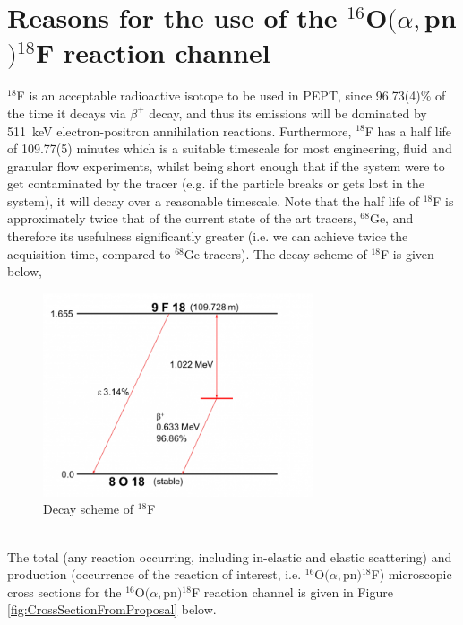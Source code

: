 \documentclass[]{article}
\begin{document}
\section{Reasons for the use of the ${}^{16}$O$(\alpha,$pn$){}^{18}$F reaction channel}\label{reasons for use}
${}^{18}$F is an acceptable radioactive isotope to be used in PEPT, since 96.73(4)$\%$ of the time it decays via $\beta ^+$ decay\cite{nudat}, and thus its emissions will be dominated by \SI{511}{\kilo \electronvolt} electron-positron annihilation reactions. Furthermore, ${}^{18}$F has a half life of 109.77(5) minutes which is a suitable timescale for most engineering, fluid and granular flow experiments, whilst being short enough that if the system were to get contaminated by the tracer (e.g. if the particle breaks or gets lost in the system), it will decay over a reasonable timescale. Note that the half life of ${}^{18}$F is approximately twice that of the current state of the art tracers, ${}^{68}$Ge, and therefore its usefulness significantly greater (i.e. we can achieve twice the acquisition time, compared to ${}^{68}$Ge tracers). The decay scheme of ${}^{18}$F is given below,
\begin{figure}[h!]
	\includegraphics[width=8cm]{f18DecayScheme.png}
	\centering
	\captionsetup{justification=centering,margin=2cm}
	\caption{Decay scheme of ${}^{18}$F\cite{decaysheme}}
	\label{fig:f18DecayScheme}
\end{figure}~\\
The total (any reaction occurring, including in-elastic and elastic scattering) and production (occurrence of the reaction of interest, i.e. ${}^{16}$O$(\alpha,$pn$){}^{18}$F) microscopic cross sections for the ${}^{16}$O$(\alpha,$pn$){}^{18}$F reaction channel is given in Figure \ref{fig:CrossSectionFromProposal} below.
\end{document}
